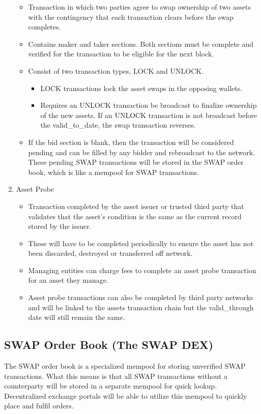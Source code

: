 \documentclass[12pt]{article}
\begin{document}
\begin{enumerate}
\begin{itemize}
			\item{Transaction in which two parties agree to swap 
				ownership of two assets with the contingency that 
				each transaction clears before the swap completes.}
			\item{Contains maker and taker sections. Both sections must
				be complete and verified for the transaction to be eligible for
				the next block.}
			\item{Consist of two transaction types, LOCK and UNLOCK.} 
				\begin{itemize}
					\item{LOCK transactions lock the asset swaps in the opposing wallets.}  
					\item{Requires an UNLOCK transaction be broadcast to finalize ownership of the new assets. If an UNLOCK transaction is not broadcast before the valid\_to\_date, the swap transaction reverses.}
				\end{itemize}
			\item{If the bid section is blank, then the transaction will be considered pending and can
				be filled by any bidder and rebroadcast to the network. These pending SWAP transactions
				will be stored in the SWAP order book, which is like a mempool for SWAP transactions.} 
		\end{itemize}
	\item Asset Probe
		\begin{itemize}
			\item{Transaction completed by the asset issuer or 
				trusted third party that validates that the asset's condition 
				is the same as the current record stored by the issuer.}
			\item{These will have to be 
				completed periodically to ensure the asset has not been 
				discarded, destroyed or transferred off network.}
			\item{Managing 
				entities can charge fees to complete an asset probe transaction 
				for an asset they manage.}
			\item{Asset probe transactions can also 
				be completed by third party networks and will be linked to 
				the assets transaction chain but the valid\_through date 
				will still remain the same.}
		\end{itemize}
\end{enumerate}


\subsection{SWAP Order Book (The SWAP DEX)}
The SWAP order book is a specialized mempool for storing unverified SWAP transactions.  What this means is that
all SWAP transactions without a counterparty will be stored in a separate mempool for quick lookup. 
Decentralized exchange portals will be able to utilize this mempool to quickly place and fulfil orders.
\end{document}

